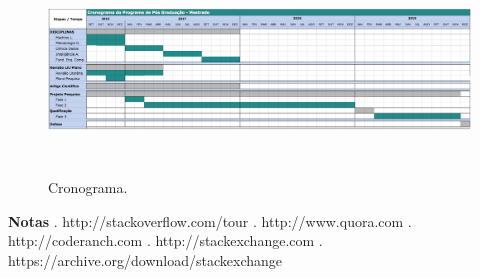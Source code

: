 \documentclass[10pt,a4paper,final]{article}
\begin{document}
\begin{figure}[!htb]
\centering
\includegraphics[height=4.8cm]{Figures/cronograma_projeto_project_timeline_retrato}\label{fig:cronograma_projeto_project_timeline_retrato}   
\caption{Cronograma.}
\end{figure}



\textbf{\newline Notas}
\newline
{}. http://stackoverflow.com/tour . http://www.quora.com . http://coderanch.com . http://stackexchange.com . https://archive.org/download/stackexchange

\nocite{Joorabchi2015}
\nocite{Manning2009}
\nocite{Mihalcea2007}
\nocite{Mihalcea2001}
\nocite{Mihalcea2004}
\nocite{Milne}
\nocite{Miotto2013}
\nocite{Posch2014}
\nocite{Roul2015}
\nocite{Udell2005}

{}  


    
\end{document}
